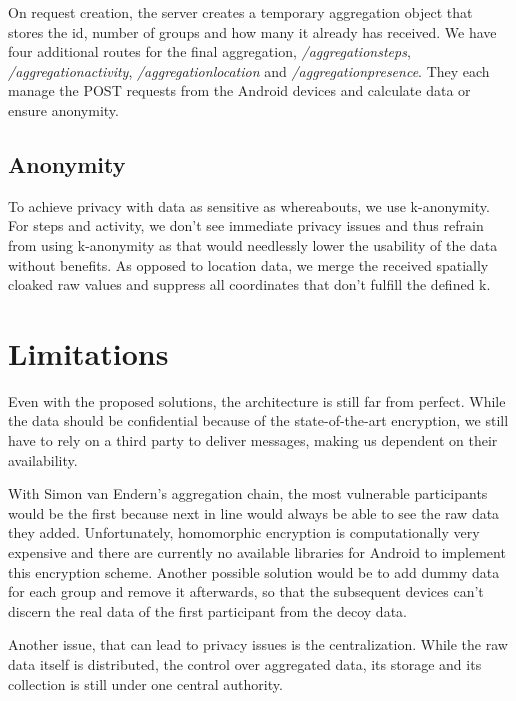 On request creation, the server creates a temporary aggregation object that stores the id, number of groups and how many it already has received. We have four additional routes for the final aggregation, \textit{/aggregationsteps}, \textit{/aggregationactivity}, \textit{/aggregationlocation} and \textit{/aggregationpresence}. They each manage the POST requests from the Android devices and calculate data or ensure anonymity.

\subsection{Anonymity}

To achieve privacy with data as sensitive as whereabouts, we use k-anonymity. For steps and activity, we don't see immediate privacy issues and thus refrain from using k-anonymity as that would needlessly lower the usability of the data without benefits. As opposed to location data, we merge the received spatially cloaked raw values and suppress all coordinates that don't fulfill the defined k. 

\section{Limitations}
Even with the proposed solutions, the architecture is still far from perfect. While the data should be confidential because of the state-of-the-art encryption, we still have to rely on a third party to deliver messages, making us dependent on their availability.

With Simon van Endern's aggregation chain, the most vulnerable participants would be the first because next in line would always be able to see the raw data they added. Unfortunately, homomorphic encryption is computationally very expensive and there are currently no available libraries for Android to implement this encryption scheme. Another possible solution would be to add dummy data for each group and remove it afterwards, so that the subsequent devices can't discern the real data of the first participant from the decoy
 data.

Another issue, that can lead to privacy issues is the centralization. While the raw data itself is distributed, the control over aggregated data, its storage and its collection is still under one central authority.